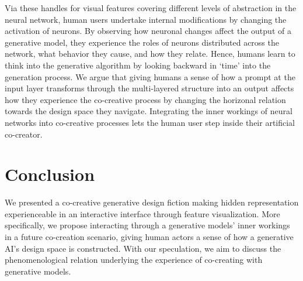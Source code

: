 \documentclass[manuscript]{acmart}
\begin{document}
Via these handles for visual features covering different levels of abstraction in the neural network, human users undertake internal modifications by changing the activation of neurons.
By observing how neuronal changes affect the output of a generative model, they experience the roles of neurons distributed across the network, what behavior they cause, and how they relate.
Hence, humans learn to think into the generative algorithm by looking backward in `time' into the generation process.
We argue that giving humans a sense of how a prompt at the input layer transforms through the multi-layered structure into an output affects how they experience the co-creative process by changing the horizonal relation towards the design space they navigate.
Integrating the inner workings of neural networks into co-creative processes lets the human user step inside their artificial co-creator.

%

\section{Conclusion}

We presented a co-creative generative design fiction making hidden representation experienceable in an interactive interface through feature visualization.
More specifically, we propose interacting through a generative models' inner workings in a future co-creation scenario, giving human actors a sense of how a generative AI's design space is constructed.
With our speculation, we aim to discuss the phenomenological relation underlying the experience of  co-creating with generative models.
\end{document}
